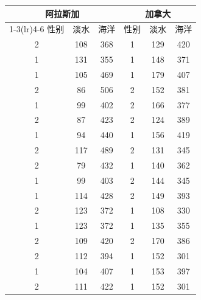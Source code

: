 \begin{mvtable}
\label{tab:11.2}
\begin{tabular}{cccccc}
\toprule
\multicolumn{3}{c}{阿拉斯加} & \multicolumn{3}{c}{加拿大}\\
\cmidrule(lr){1-3}\cmidrule(lr){4-6}
性别 & 淡水 & 海洋 & 性别 & 淡水 & 海洋\\
\midrule
2 & 108 & 368 & 1 & 129 & 420\\
1 & 131 & 355 & 1 & 148 & 371\\
1 & 105 & 469 & 1 & 179 & 407\\
2 & 86 & 506 & 2 & 152 & 381\\
1 & 99 & 402 & 2 & 166 & 377\\
2 & 87 & 423 & 2 & 124 & 389\\
1 & 94 & 440 & 1 & 156 & 419\\
2 & 117 & 489 & 2 & 131 & 345\\
2 & 79 & 432 & 1 & 140 & 362\\
1 & 99 & 403 & 2 & 144 & 345\\
1 & 114 & 428 & 2 & 149 & 393\\
2 & 123 & 372 & 1 & 108 & 330\\
1 & 123 & 372 & 1 & 135 & 355\\
2 & 109 & 420 & 2 & 170 & 386\\
2 & 112 & 394 & 1 & 152 & 301\\
1 & 104 & 407 & 1 & 153 & 397\\
2 & 111 & 422 & 1 & 152 & 301\\
\bottomrule
\end{tabular}
\end{mvtable}
